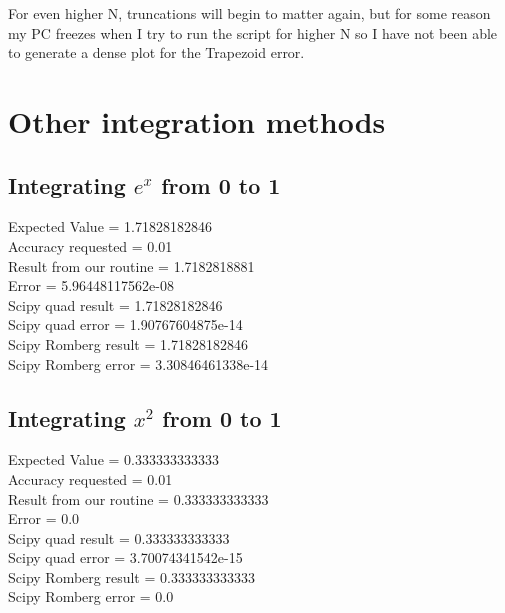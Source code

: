 \documentclass[11pt]{article}
\begin{document}
For even higher N, truncations will begin to matter again, but for some reason my PC freezes when I try to run the script for higher N so I have not been able to generate a dense plot for the Trapezoid error.
\newpage

\section{Other integration methods}
\subsection{Integrating $e^x$ from 0 to 1}
Expected Value = 1.71828182846 \\
Accuracy requested = 0.01 \\
Result from our routine = 1.7182818881 \\
Error = 5.96448117562e-08 \\


Scipy quad result = 1.71828182846 \\
Scipy quad error = 1.90767604875e-14 \\


Scipy Romberg result = 1.71828182846 \\
Scipy Romberg error = 3.30846461338e-14 \\

\subsection{Integrating $x^2$ from 0 to 1}
Expected Value = 0.333333333333 \\
Accuracy requested = 0.01 \\
Result from our routine = 0.333333333333 \\
Error = 0.0 \\


Scipy quad result = 0.333333333333 \\
Scipy quad error = 3.70074341542e-15 \\


Scipy Romberg result = 0.333333333333 \\
Scipy Romberg error = 0.0 \\
\end{document}
